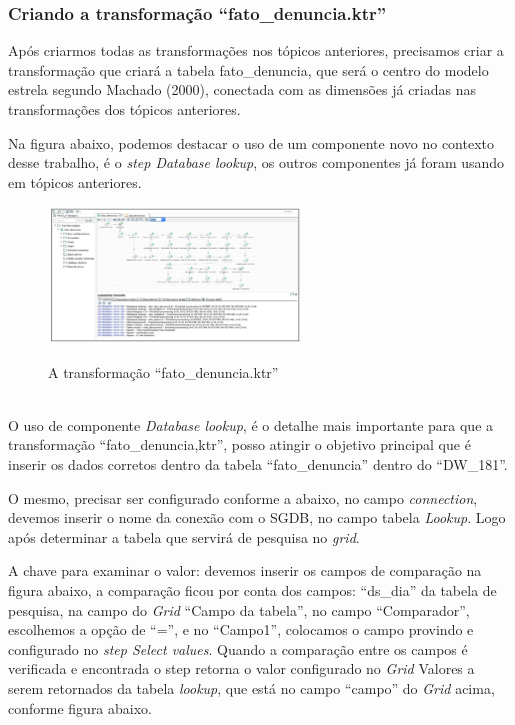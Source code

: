 \subsubsection{Criando a transforma\c{c}\~{a}o ``fato\_denuncia.ktr''}

Ap\'os criarmos todas as transforma\c{c}\~{o}es nos t\'opicos anteriores,
 precisamos criar a transforma\c{c}\~{a}o que criar\'{a} a tabela fato\_denuncia, 
 que ser\'{a} o centro do modelo estrela segundo Machado (2000), conectada com as dimens\~{o}es j\'{a} 
 criadas nas transforma\c{c}\~{o}es dos t\'opicos anteriores.

Na figura abaixo, podemos destacar o uso de um componente novo no contexto desse trabalho, \'{e} o 
\textit{step Database lookup}, os outros componentes j\'{a} foram usando em t\'opicos anteriores.

\begin{figure}[H]
	\vspace*{0,2cm}
    \centering
    \caption{A transforma\c{c}\~{a}o ``fato\_denuncia.ktr''}
    \includegraphics[width=0.6\textwidth]{./04-figuras/figura-fato}
    \label{fig:ilustfigfato}
\end{figure}
\vspace*{-0,9cm}
{\raggedright {}} \\

O uso de componente \textit{Database lookup}, \'{e} o detalhe mais importante para que a transforma\c{c}\~{a}o 
``fato\_denuncia,ktr'', posso atingir o objetivo principal que \'{e} inserir os dados corretos dentro da tabela 
``fato\_denuncia'' dentro do ``DW\_181''. 

O mesmo, precisar ser configurado conforme a abaixo, no campo \textit{connection}, devemos inserir o 
nome da conex\~{a}o com o SGDB, no campo tabela \textit{Lookup}. Logo ap\'{o}s determinar a tabela que servir\'{a} de 
pesquisa no \textit{grid}.

A chave para examinar o valor: devemos inserir os campos de compara\c{c}\~{a}o na 
figura abaixo, a compara\c{c}\~{a}o ficou por conta dos campos: ``ds\_dia''  da tabela de pesquisa, na campo do 
\textit{Grid} ``Campo da tabela'', no campo ``Comparador'', escolhemos a op\c{c}\~{a}o de ``='', e no 
``Campo1'', colocamos o campo provindo e configurado no \textit{step Select values}. Quando a compara\c{c}\~{a}o 
entre os campos \'{e} verificada e encontrada o step retorna o valor configurado no \textit{Grid} Valores a serem 
retornados da tabela \textit{lookup}, que est\'{a} no campo ``campo'' do \textit{Grid} acima, conforme figura abaixo.


